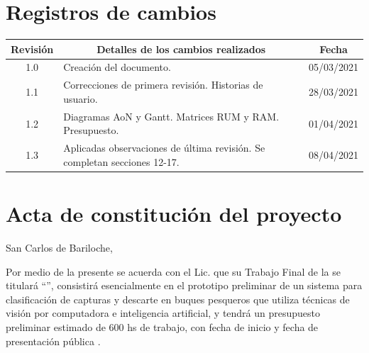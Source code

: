 \documentclass[11pt]{charter}
\begin{document}
\maketitle
\thispagestyle{empty}
\pagebreak


\thispagestyle{empty}
{\setlength{\parskip}{0pt}
\tableofcontents{}
}
\pagebreak


\section{Registros de cambios}
\label{sec:registro}


\begin{table}[ht]
\label{tab:registro}
\centering
\begin{tabularx}{\linewidth}{@{}|c|X|c|@{}}
\hline
\rowcolor[HTML]{C0C0C0} 
Revisión & \multicolumn{1}{c|}{\cellcolor[HTML]{C0C0C0}Detalles de los cambios realizados} & Fecha      \\ \hline
1.0      & Creación del documento.                                          & 05/03/2021 \\ \hline
1.1      & Correcciones de primera revisión. Historias de usuario.          & 28/03/2021 \\ \hline
1.2      & Diagramas AoN y Gantt. Matrices RUM y RAM. Presupuesto.          & 01/04/2021 \\ \hline
1.3      & Aplicadas observaciones de última revisión. Se completan secciones 12-17.   & 08/04/2021 \\ \hline
\end{tabularx}
\end{table}

\pagebreak

\section{Acta de constitución del proyecto}
\label{sec:acta}

\begin{flushright}
San Carlos de Bariloche, \fechaInicioName
\end{flushright}

\vspace{2cm}

Por medio de la presente se acuerda con el Lic. \authorname\hspace{1px} que su Trabajo Final de la \degreename\hspace{1px} se titulará ``\ttitle'', consistirá esencialmente en el prototipo preliminar de un sistema para clasificación de capturas y descarte en buques pesqueros que utiliza técnicas de visión por computadora e inteligencia artificial, y tendrá un presupuesto preliminar estimado de 600 hs de trabajo, con fecha de inicio \fechaInicioName\hspace{1px} y fecha de presentación pública \fechaFinalName.
\end{document}
